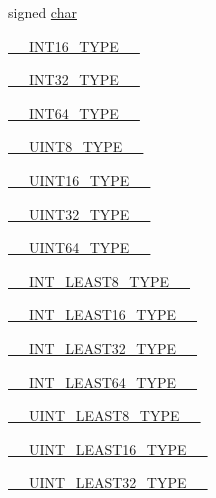 \begin{DoxyCompactItemize}
\item 
signed \hyperlink{CMakeCache_8txt_afe71f11dacb15682cdc012f7208e6e09}{char}
\item 
\hyperlink{CMakeCache_8txt_aecf40d0b02f3ea9194acecf92ef8ad0b}{\+\_\+\+\_\+\+I\+N\+T16\+\_\+\+T\+Y\+P\+E\+\_\+\+\_\+}
\item 
\hyperlink{CMakeCache_8txt_aff307c0fcea6eefb5eead1fd6d9b8153}{\+\_\+\+\_\+\+I\+N\+T32\+\_\+\+T\+Y\+P\+E\+\_\+\+\_\+}
\item 
\hyperlink{CMakeCache_8txt_aa68c5513d779cc8e92de1fb1e99a1451}{\+\_\+\+\_\+\+I\+N\+T64\+\_\+\+T\+Y\+P\+E\+\_\+\+\_\+}
\item 
\hyperlink{CMakeCache_8txt_acdac745c75cc6d9467f0e8f428cb7c38}{\+\_\+\+\_\+\+U\+I\+N\+T8\+\_\+\+T\+Y\+P\+E\+\_\+\+\_\+}
\item 
\hyperlink{CMakeCache_8txt_a7c334ef15565439f16847268e5aecc00}{\+\_\+\+\_\+\+U\+I\+N\+T16\+\_\+\+T\+Y\+P\+E\+\_\+\+\_\+}
\item 
\hyperlink{CMakeCache_8txt_ae5f84304c1e72cdd73b6da53c4d47f25}{\+\_\+\+\_\+\+U\+I\+N\+T32\+\_\+\+T\+Y\+P\+E\+\_\+\+\_\+}
\item 
\hyperlink{CMakeCache_8txt_ae5334e804b67b171a886cb9c2a6241f0}{\+\_\+\+\_\+\+U\+I\+N\+T64\+\_\+\+T\+Y\+P\+E\+\_\+\+\_\+}
\item 
\hyperlink{CMakeCache_8txt_a0f059754211c536004913c4594b226b7}{\+\_\+\+\_\+\+I\+N\+T\+\_\+\+L\+E\+A\+S\+T8\+\_\+\+T\+Y\+P\+E\+\_\+\+\_\+}
\item 
\hyperlink{CMakeCache_8txt_a6841cc391d897d17cd36b6389eedf1a9}{\+\_\+\+\_\+\+I\+N\+T\+\_\+\+L\+E\+A\+S\+T16\+\_\+\+T\+Y\+P\+E\+\_\+\+\_\+}
\item 
\hyperlink{CMakeCache_8txt_a2bf5f979cc9392d0cf97a14d736d628a}{\+\_\+\+\_\+\+I\+N\+T\+\_\+\+L\+E\+A\+S\+T32\+\_\+\+T\+Y\+P\+E\+\_\+\+\_\+}
\item 
\hyperlink{CMakeCache_8txt_acaedfaa861fcf2ab2ed6fef67d552001}{\+\_\+\+\_\+\+I\+N\+T\+\_\+\+L\+E\+A\+S\+T64\+\_\+\+T\+Y\+P\+E\+\_\+\+\_\+}
\item 
\hyperlink{CMakeCache_8txt_a2a5868ec6fe252f426662079d5187d04}{\+\_\+\+\_\+\+U\+I\+N\+T\+\_\+\+L\+E\+A\+S\+T8\+\_\+\+T\+Y\+P\+E\+\_\+\+\_\+}
\item 
\hyperlink{CMakeCache_8txt_a0cf7166f2026cc52431a063b5f16caa7}{\+\_\+\+\_\+\+U\+I\+N\+T\+\_\+\+L\+E\+A\+S\+T16\+\_\+\+T\+Y\+P\+E\+\_\+\+\_\+}
\item 
\hyperlink{CMakeCache_8txt_a2b66f33976e9bc55e27367e3b1448e40}{\+\_\+\+\_\+\+U\+I\+N\+T\+\_\+\+L\+E\+A\+S\+T32\+\_\+\+T\+Y\+P\+E\+\_\+\+\_\+}
\item 

\end{DoxyCompactItemize}
